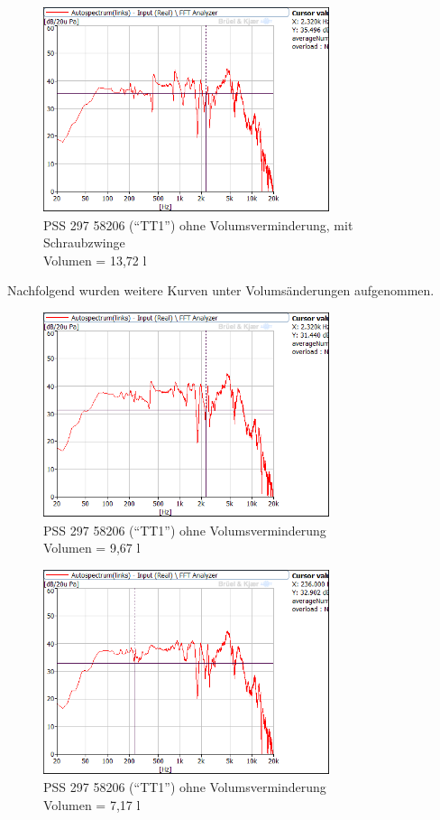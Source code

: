 \begin{figure} [H]
	\centering
	\includegraphics[width=0.75\textwidth]{img/Optimierung/TT/TT1_ohneAllem_Schraubzwinge.png}
	\caption{PSS 297 58206 (\enquote{TT1}) ohne Volumsverminderung, mit Schraubzwinge \\Volumen = 13,72 l}
	\label{fig:4.4.3.3}
\end{figure}

\newpage
Nachfolgend wurden weitere Kurven unter Volumsänderungen aufgenommen.

\begin{figure} [H]
	\centering
	\includegraphics[width=0.75\textwidth]{img/Optimierung/TT/TT1_Styro_9-67l.png}
	\caption{PSS 297 58206 (\enquote{TT1}) ohne Volumsverminderung \\Volumen = 9,67 l}
	\label{fig:4.4.3.4}
\end{figure}

\begin{figure} [H]
	\centering
	\includegraphics[width=0.75\textwidth]{img/Optimierung/TT/TT1_Styro_7-17l.png}
	\caption{PSS 297 58206 (\enquote{TT1}) ohne Volumsverminderung \\Volumen = 7,17 l}
	\label{fig:4.4.3.5}
\end{figure}


